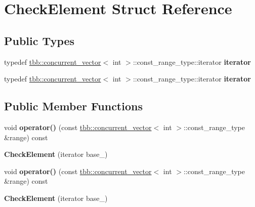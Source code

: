 \hypertarget{structCheckElement}{}\section{Check\+Element Struct Reference}
\label{structCheckElement}
\subsection*{Public Types}
\begin{DoxyCompactItemize}
\item 
\hypertarget{structCheckElement_a0d9d4a0202fdcbeffac8d324c67f7742}{}typedef \hyperlink{classtbb_1_1concurrent__vector}{tbb\+::concurrent\+\_\+vector}$<$ int $>$\+::const\+\_\+range\+\_\+type\+::iterator {\bfseries iterator}\label{structCheckElement_a0d9d4a0202fdcbeffac8d324c67f7742}

\item 
\hypertarget{structCheckElement_a0d9d4a0202fdcbeffac8d324c67f7742}{}typedef \hyperlink{classtbb_1_1concurrent__vector}{tbb\+::concurrent\+\_\+vector}$<$ int $>$\+::const\+\_\+range\+\_\+type\+::iterator {\bfseries iterator}\label{structCheckElement_a0d9d4a0202fdcbeffac8d324c67f7742}

\end{DoxyCompactItemize}
\subsection*{Public Member Functions}
\begin{DoxyCompactItemize}
\item 
\hypertarget{structCheckElement_af0f40f2e6dc5a37d8982f8e7dcddaf3e}{}void {\bfseries operator()} (const \hyperlink{classtbb_1_1concurrent__vector}{tbb\+::concurrent\+\_\+vector}$<$ int $>$\+::const\+\_\+range\+\_\+type \&range) const \label{structCheckElement_af0f40f2e6dc5a37d8982f8e7dcddaf3e}

\item 
\hypertarget{structCheckElement_ab52fed178af11031fff99fb46bae2e0a}{}{\bfseries Check\+Element} (iterator base\+\_\+)\label{structCheckElement_ab52fed178af11031fff99fb46bae2e0a}

\item 
\hypertarget{structCheckElement_af0f40f2e6dc5a37d8982f8e7dcddaf3e}{}void {\bfseries operator()} (const \hyperlink{classtbb_1_1concurrent__vector}{tbb\+::concurrent\+\_\+vector}$<$ int $>$\+::const\+\_\+range\+\_\+type \&range) const \label{structCheckElement_af0f40f2e6dc5a37d8982f8e7dcddaf3e}

\item 
\hypertarget{structCheckElement_ab52fed178af11031fff99fb46bae2e0a}{}{\bfseries Check\+Element} (iterator base\+\_\+)\label{structCheckElement_ab52fed178af11031fff99fb46bae2e0a}

\end{DoxyCompactItemize}
